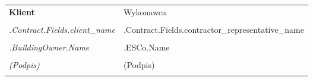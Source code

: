 
\mbox{}\vfill %
\begin{tabu}{X X} \tabucline{}
	\rowfont[c]\bfseries Klient & Wykonawca \\
	[10pt]\makebox[8cm]{\hrulefill} & \makebox[8cm]{\hrulefill} \\
	\rowfont[c]\itshape {{.Contract.Fields.client_name}} & {{.Contract.Fields.contractor_representative_name}} \\
	[10pt]\makebox[8cm]{\hrulefill} & \makebox[8cm]{\hrulefill} \\
	\rowfont[c]\itshape {{.BuildingOwner.Name}} & {{.ESCo.Name}} \\
	[10pt]\makebox[8cm]{\hrulefill} & \makebox[8cm]{\hrulefill} \\
	\rowfont[c]\itshape (Podpis) & (Podpis) \\[4cm] \\
\end{tabu}
\pagebreak
